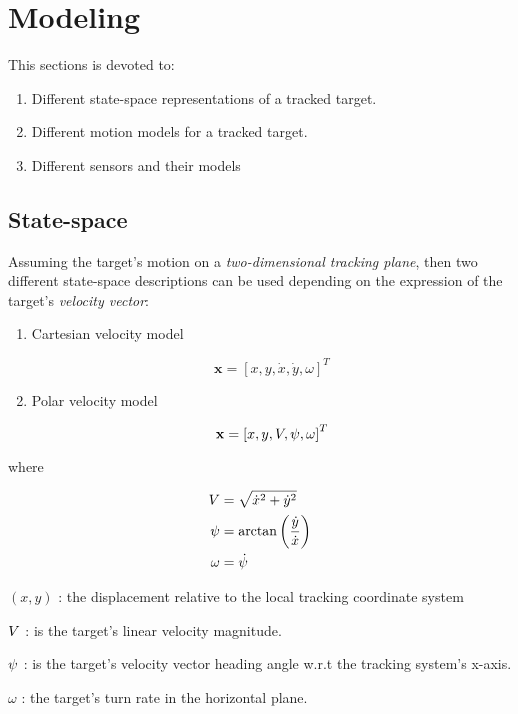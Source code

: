 \chapter{Modeling}
This sections is devoted to:

\begin{enumerate}
	\item Different state-space representations of a tracked target.
	\item Different motion models for a tracked target.
	\item Different sensors and their models	
\end{enumerate}

\section{State-space} \label{sec:SS}
Assuming the target's motion on a \emph{two-dimensional tracking plane}, then two different state-space descriptions can be used depending on the expression of the target's \emph{velocity vector}:

\begin{enumerate}
	\item Cartesian velocity model 
	
	$$\mathbf{x} = \left[x,y,\dot{x}, \dot{y},\omega\right]^{T} $$
		
	\item Polar velocity model 
	
	$$\mathbf{x} = \left[x,y,{V}, {\psi},\omega\right]^{T} $$
		
\end{enumerate}

where

\begin{subequations}
	\begin{align}
		{V} &= \sqrt{\dot{x}^2 + \dot{y}^2}  \\
		{\psi} &= \arctan\left(\frac{\dot{y}}{\dot{x}}\right) \\
		{\omega} &= \dot{{\psi}}
	\end{align}
\end{subequations}

\begin{description}
	\item $(x,y)$ : the displacement relative to the local tracking coordinate system
	\item ${V}$ : is the target's linear velocity magnitude.
	\item ${\psi}$ : is the target's velocity vector heading angle w.r.t the tracking system's x-axis.
	\item $\omega$ : the target's turn rate in the horizontal plane.
\end{description}






